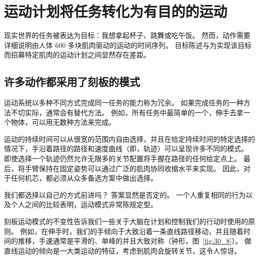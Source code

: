 \section{运动计划将任务转化为有目的的运动}

现实世界的任务被表达为目标：我想拿起杯子、跳舞或吃午饭。
然而，动作需要详细说明由人体 600 多块肌肉驱动的运动的时间序列。
目标陈述与为实现该目标而招募特定肌肉的运动计划之间显然存在差距。



\subsection{许多动作都采用了刻板的模式}

运动系统以多种不同方式完成同一任务的能力称为冗余。 
如果完成任务的一种方法不切实际，通常会有替代方法。 
例如，所有任务中最简单的一个，伸手去拿一个物体，可以用无数种方法来完成。


运动的持续时间可以从很宽的范围内自由选择，并且在给定持续时间的特定选择的情况下，手沿着路径的路径和速度曲线（即，轨迹）可以呈现许多不同的模式。
即使选择一个轨迹仍然允许无限多的关节配置将手握在路径的任何给定点上。
最后，将手臂保持在固定姿势可以通过广泛的肌肉协同收缩水平来实现。
因此，对于任何机芯，都必须从众多备选方案中做出选择。


我们都选择以自己的方式前进吗？
答案显然是否定的。
一个人重复相同的行为以及个人之间的比较表明，运动模式非常陈规定型。


刻板运动模式的不变性告诉我们一些关于大脑在计划和控制我们的行动时使用的原则。
例如，在伸手时，我们的手倾向于大致沿着一条直线路径移动，并且随着时间的推移，手速通常是平滑的、单峰的并且大致对称（钟形，图~\ref{fig:30_8}）。
做直线运动的倾向是一大类运动的特征，考虑到肌肉会旋转关节，这令人惊讶。


